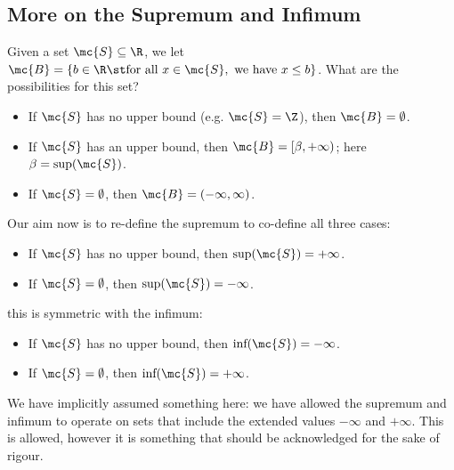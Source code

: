 \subsection{More on the Supremum and Infimum}
Given a set \(\mc{S}\subseteq\R\), we let \(\mc{B}=\{b\in\R\st\text{for all}~x\in\mc{S},~\text{we have}~x\leq b\}\). What are the possibilities for this set?
\begin{itemize}
	\item If \(\mc{S}\) has no upper bound (e.g. \(\mc{S}=\Z\)), then \(\mc{B}=\emptyset\).
	
	\item If \(\mc{S}\) has an upper bound, then \(\mc{B}=[\beta,+\infty)\); here \(\beta=\text{sup}(\mc{S})\).
	
	\item If \(\mc{S}=\emptyset\), then \(\mc{B}=(-\infty,\infty)\).
\end{itemize}
Our aim now is to re-define the supremum to co-define all three cases:
\begin{itemize}
	\item If \(\mc{S}\) has no upper bound, then \(\text{sup}(\mc{S})=+\infty\).
	
	\item If \(\mc{S}=\emptyset\), then \(\text{sup}(\mc{S})=-\infty\).
\end{itemize}
this is symmetric with the infimum:
\begin{itemize}
	\item If \(\mc{S}\) has no upper bound, then \(\text{inf}(\mc{S})=-\infty\).
	
	\item If \(\mc{S}=\emptyset\), then \(\text{inf}(\mc{S})=+\infty\).
\end{itemize}
We have implicitly assumed something here: we have allowed the supremum and infimum to operate on sets that include the extended values \(-\infty\) and \(+\infty\). This is allowed, however it is something that should be acknowledged for the sake of rigour.

\clearpage

